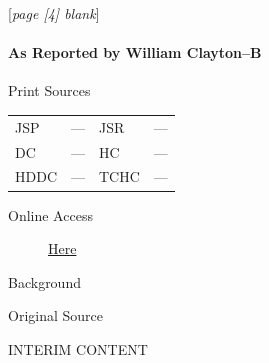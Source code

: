					[\textit{page [4] blank}]
				
			\paragraph{As Reported by William Clayton--B}
				\label{EMS-1843-JS-6-8-APR-1843-WC-B}
			
				\begin{description}
					\item[Print Sources]
				\end{description}

					\begin{tabular}{p{0.5in}p{1in}p{0.5in}p{1in}}
					JSP	 	& ---		& JSR 		& --- \\
					DC	 	& ---		& HC 		& --- \\
					HDDC 	& ---		& TCHC 		& --- \\
					\end{tabular}
				
				\begin{description}
					\item[Online Access] \href{https://www.josephsmithpapers.org/paper-summary/discourse-8-april-1843-as-reported-by-william-clayton-b/1}{Here}
				\end{description}
				
				\begin{description}
					\item[Background]
				\end{description}
				
				
				\begin{description}
					\item[Original Source]
				\end{description}
				
					INTERIM CONTENT
					
				
